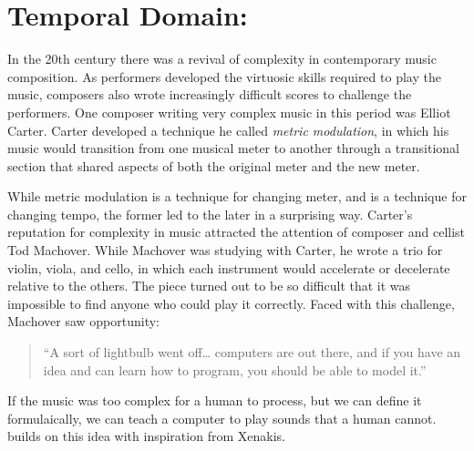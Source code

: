 \chapter{Temporal Domain: \polytempic}
\label{ch:polytempic}
In the 20th century there was a revival of complexity in contemporary
music composition. As performers developed the virtuosic skills required to
play the music, composers also wrote increasingly difficult scores to
challenge the performers.\cite{grout2006} One composer writing very
complex music in this period was Elliot Carter. Carter developed a
technique he called \textit{metric modulation}, in which his music
would transition from one musical meter to another through a
transitional section that shared aspects of both the original meter
and the new meter.

While metric modulation is a technique for changing meter, and
\polytempic is a technique for changing tempo, the former led to the
later in a surprising way. Carter's reputation for complexity in music
attracted the attention of composer and cellist Tod Machover. While
Machover was studying with Carter, he wrote a trio for violin, viola,
and cello, in which each instrument would accelerate or decelerate
relative to the others. The piece turned out to be so difficult that
it was impossible to find anyone who could play it correctly. Faced
with this challenge, Machover saw opportunity:
\begin{quotation}``A sort of lightbulb went off\ldots{} computers are out
  there, and if you have an idea and can learn how to program, you
  should be able to model it.''\cite{Fein2014}
\end{quotation}
If the music was too complex for a human to process, but we can define
it formulaically, we can teach a computer to play sounds that a human
cannot. \polytempic builds on this idea with inspiration from Xenakis.

